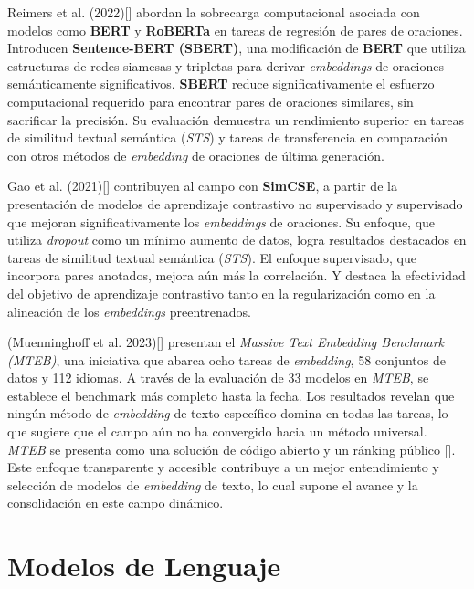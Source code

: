     Reimers et al. (2022)[\cite{reimers2019sentencebert}] abordan la sobrecarga computacional asociada con modelos como \textbf{BERT} y \textbf{RoBERTa} en tareas de regresión de pares de oraciones. Introducen \textbf{Sentence-BERT (SBERT)}, una modificación de \textbf{BERT} que utiliza estructuras de redes siamesas y tripletas para derivar \emph{embeddings} de oraciones semánticamente significativos. \textbf{SBERT} reduce significativamente el esfuerzo computacional requerido para encontrar pares de oraciones similares, sin sacrificar la precisión. Su evaluación demuestra un rendimiento superior en tareas de similitud textual semántica (\emph{STS}) y tareas de transferencia en comparación con otros métodos de \emph{embedding} de oraciones de última generación.

    Gao et al. (2021)[\cite{gao2022simcse}] contribuyen al campo con \textbf{SimCSE}, a partir de la presentación de modelos de aprendizaje contrastivo no supervisado y supervisado que mejoran significativamente los \emph{embeddings} de oraciones. Su enfoque, que utiliza \emph{dropout} como un mínimo aumento de datos, logra resultados destacados en tareas de similitud textual semántica (\emph{STS}). El enfoque supervisado, que incorpora pares anotados, mejora aún más la correlación. Y destaca la efectividad del objetivo de aprendizaje contrastivo tanto en la regularización como en la alineación de los \emph{embeddings} preentrenados.

    (Muenninghoff et al. 2023)[\cite{muennighoff2023mteb}] presentan el \emph{Massive Text Embedding Benchmark (MTEB)}, una iniciativa que abarca ocho tareas de \emph{embedding}, 58 conjuntos de datos y 112 idiomas. A través de la evaluación de 33 modelos en \emph{MTEB}, se establece el benchmark más completo hasta la fecha. Los resultados revelan que ningún método de \emph{embedding} de texto específico domina en todas las tareas, lo que sugiere que el campo aún no ha convergido hacia un método universal. \emph{MTEB} se presenta como una solución de código abierto y un ránking público [\cite{leaderboard}]. Este enfoque transparente y accesible contribuye a un mejor entendimiento y selección de modelos de \emph{embedding} de texto, lo cual supone el avance y la consolidación en este campo dinámico.

\section{Modelos de Lenguaje}
   
